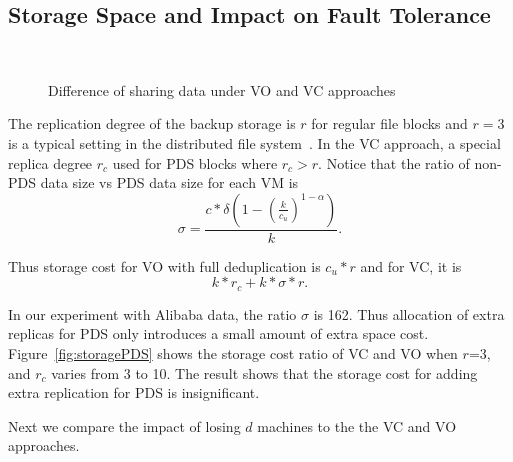 \subsection{Storage Space and Impact on Fault Tolerance}
 
\begin{figure}
    \centering
    \\
    \caption{Difference of sharing data under VO and VC approaches}
    \label{fig:share}
\end{figure}

The replication degree of the backup storage 
is $r$ for regular file blocks and $r=3$ is a typical setting in the distributed
file system~\cite{Hadoop,GFS}.
In the VC approach, a special replica degree $r_c$ used for PDS blocks where $r_c>r$. 
Notice that the ratio of non-PDS data size vs PDS data size for each VM is
\[
\sigma=  \frac{c*\delta(1 -   (\frac{k}{c_u})^{1-\alpha})} {k}.
\]

Thus  storage cost for VO with full deduplication is $c_u *r$ and for VC, it is
\[ k*r_c  + k*\sigma *r.
\]

In our experiment with Alibaba data, the ratio $\sigma$ 
is 162. Thus allocation of extra replicas for PDS only introduces a small amount of extra space
cost.  Figure~\ref{fig:storagePDS} shows the storage cost ratio of VC and VO when 
$r$=3, and $r_c$ varies from 3 to 10.
The result shows that the storage cost for adding extra replication for PDS
is insignificant.


Next we  compare the impact of losing $d$ machines 
to the the VC and VO approaches.  


